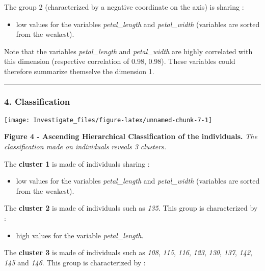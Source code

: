 \documentclass[]{article}
\providecommand{\tightlist}{%
  \setlength{\itemsep}{0pt}\setlength{\parskip}{0pt}}
\begin{document}
The group 2 (characterized by a negative coordinate on the axis) is
sharing :

\begin{itemize}
\tightlist
\item
  low values for the variables \emph{petal\_length} and
  \emph{petal\_width} (variables are sorted from the weakest).
\end{itemize}

Note that the variables \emph{petal\_length} and \emph{petal\_width} are
highly correlated with this dimension (respective correlation of 0.98,
0.98). These variables could therefore summarize themselve the dimension
1.

\begin{center}\rule{0.5\linewidth}{\linethickness}\end{center}

\subsubsection{4. Classification}\label{classification}

\begin{center}\texttt{[image: Investigate\_files/figure-latex/unnamed-chunk-7-1]} \end{center}

\textbf{Figure 4 - Ascending Hierarchical Classification of the
individuals.} \emph{The classification made on individuals reveals 3
clusters.}

The \textbf{cluster 1} is made of individuals sharing :

\begin{itemize}
\tightlist
\item
  low values for the variables \emph{petal\_length} and
  \emph{petal\_width} (variables are sorted from the weakest).
\end{itemize}

The \textbf{cluster 2} is made of individuals such as \emph{135}. This
group is characterized by :

\begin{itemize}
\tightlist
\item
  high values for the variable \emph{petal\_length}.
\end{itemize}

The \textbf{cluster 3} is made of individuals such as \emph{108},
\emph{115}, \emph{116}, \emph{123}, \emph{130}, \emph{137}, \emph{142},
\emph{145} and \emph{146}. This group is characterized by :
\end{document}
